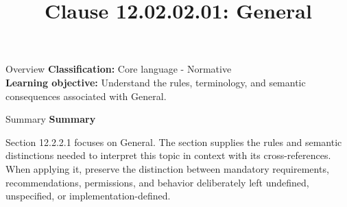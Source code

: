 \documentclass[10pt,letterpaper]{article}
\title{Clause 12.02.02.01: General}
\author{}
\date{}
\begin{document}
\maketitle
\begin{CornellOverviewBox}{Overview}
\textbf{Classification:} Core language - Normative\\[2pt]
\textbf{Learning objective:} Understand the rules, terminology, and semantic consequences associated with General.
\end{CornellOverviewBox}\begin{CornellSummaryBox}{Summary}
{\sffamily\bfseries\color{Accent} Summary}\par\vspace{3pt}Section 12.2.2.1 focuses on General. The section supplies the rules and semantic distinctions needed to interpret this topic in context with its cross-references. When applying it, preserve the distinction between mandatory requirements, recommendations, permissions, and behavior deliberately left undefined, unspecified, or implementation-defined.
\end{CornellSummaryBox}
\end{document}

